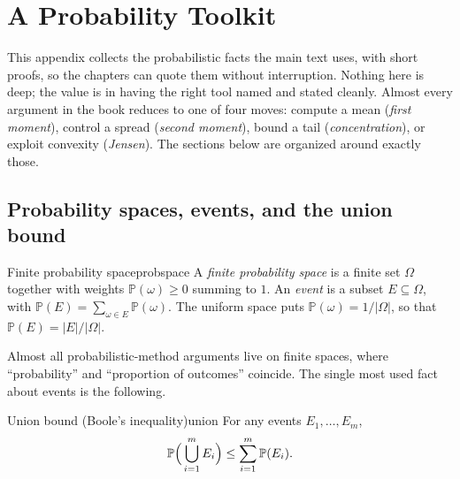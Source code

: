 \providecommand{\E}{\mathbb{E}}
\providecommand{\Prob}{\mathbb{P}}
\providecommand{\ind}{\mathbf{1}}
\providecommand{\Var}{\operatorname{Var}}
\providecommand{\Cov}{\operatorname{Cov}}

\chapter{A Probability Toolkit}
\label{chap:toolkit}

This appendix collects the probabilistic facts the main text uses, with short
proofs, so the chapters can quote them without interruption. Nothing here is
deep; the value is in having the right tool named and stated cleanly. Almost
every argument in the book reduces to one of four moves: compute a mean
(\emph{first moment}), control a spread (\emph{second moment}), bound a tail
(\emph{concentration}), or exploit convexity (\emph{Jensen}). The sections
below are organized around exactly those.

\section{Probability spaces, events, and the union bound}

\begin{definition}{Finite probability space}{probspace}
A \emph{finite probability space} is a finite set $\Omega$ together with weights
$\Prob(\omega)\ge0$ summing to $1$. An \emph{event} is a subset $E\subseteq\Omega$,
with $\Prob(E)=\sum_{\omega\in E}\Prob(\omega)$. The uniform space puts
$\Prob(\omega)=1/|\Omega|$, so that $\Prob(E)=|E|/|\Omega|$.
\end{definition}

Almost all probabilistic-method arguments live on finite spaces, where
``probability'' and ``proportion of outcomes'' coincide. The single most used
fact about events is the following.

\begin{theorem}{Union bound (Boole's inequality)}{union}
For any events $E_1,\dots,E_m$,
\[
  \Prob\Bigl(\,\bigcup_{i=1}^m E_i\Bigr)\le\sum_{i=1}^m\Prob(E_i).
\]
\end{theorem}


